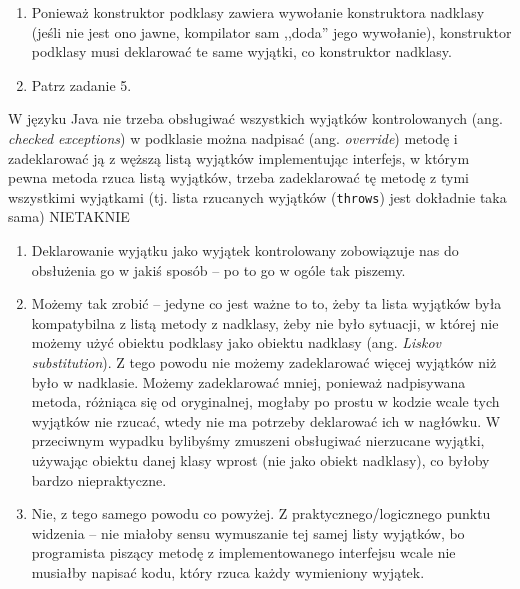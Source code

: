 \begin{solutions}
\begin{enumerate}[\bf A.]
        \item Ponieważ konstruktor podklasy zawiera wywołanie konstruktora nadklasy (jeśli nie jest ono jawne, kompilator sam ,,doda'' jego wywołanie), konstruktor podklasy musi deklarować te same wyjątki, co konstruktor nadklasy.

        \item Patrz zadanie 5.
    \end{enumerate}

    \sol W języku Java
    \answerss
    {nie trzeba obsługiwać wszystkich wyjątków kontrolowanych (ang. \textit{checked exceptions})}
    {w podklasie można nadpisać (ang. \textit{override}) metodę i zadeklarować ją z węższą listą wyjątków}
    {implementując interfejs, w którym pewna metoda rzuca listą wyjątków, trzeba zadeklarować tę metodę z tymi wszystkimi wyjątkami (tj. lista rzucanych wyjątków (\texttt{throws}) jest dokładnie taka sama)}
    {NIE}{TAK}{NIE}

    \begin{enumerate}[\bf A.]
        \item Deklarowanie wyjątku jako wyjątek kontrolowany zobowiązuje nas do obsłużenia go w jakiś sposób -- po to go w ogóle tak piszemy.

        \item Możemy tak zrobić -- jedyne co jest ważne to to, żeby ta lista wyjątków była kompatybilna z listą metody z nadklasy, żeby nie było sytuacji, w której nie możemy użyć obiektu podklasy jako obiektu nadklasy (ang. \textit{Liskov substitution}). Z tego powodu nie możemy zadeklarować więcej wyjątków niż było w nadklasie. Możemy zadeklarować mniej, ponieważ nadpisywana metoda, różniąca się od oryginalnej, mogłaby po prostu w kodzie wcale tych wyjątków nie rzucać, wtedy nie ma potrzeby deklarować ich w nagłówku. W przeciwnym wypadku bylibyśmy zmuszeni obsługiwać nierzucane wyjątki, używając obiektu danej klasy wprost (nie jako obiekt nadklasy), co byłoby bardzo niepraktyczne.

        \item Nie, z tego samego powodu co powyżej. Z praktycznego/logicznego punktu widzenia -- nie miałoby sensu wymuszanie tej samej listy wyjątków, bo programista piszący metodę z implementowanego interfejsu wcale nie musiałby napisać kodu, który rzuca każdy wymieniony wyjątek.
    \end{enumerate}
\end{solutions}